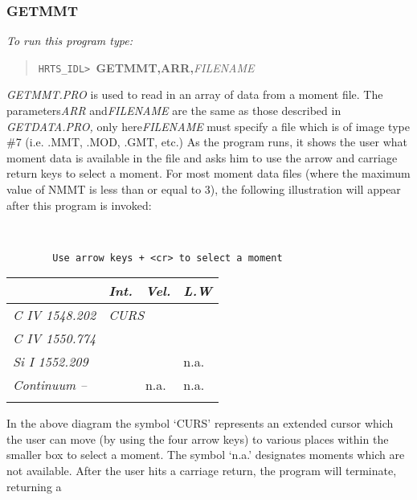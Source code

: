 \subsubsection{GETMMT}               

{\em To run this program type:}
\begin{quote}
{\tt HRTS\_IDL> }{\bf GETMMT,ARR,}{\it FILENAME}          
\end{quote}
{\em GETMMT.PRO} is used to read in an array of data from a moment file.
  The parameters{\em ARR} and{\em FILENAME} are the same as those described in 
 {\em GETDATA.PRO,} only here{\em FILENAME} must specify a file which is of
  image type \#7 (i.e. .MMT, .MOD, .GMT, etc.)  As the program runs, it
  shows the user what moment data is available in the file and asks him
  to use the arrow and carriage return keys to select a moment.
  For most moment data files (where the maximum value of NMMT is less
  than or equal to 3), the following illustration will appear after this
  program is invoked:
\begin{verbatim}

                
        Use arrow keys + <cr> to select a moment 
\end{verbatim}
\begin{center}
\begin{tabular}{|l l l l l|}
\hline
                &        & {\em Int.} & {\em Vel.} & {\em L.W} \\    
\hline
\multicolumn{2}{|l|}{\em C IV  1548.202} & \multicolumn{3}{l|}{\em CURS} \\
\cline{3-5}   
\multicolumn{2}{|l|}{\em C IV  1550.774} & \multicolumn{3}{l|}{} \\                       
\multicolumn{2}{|l|}{\em Si I  1552.209} & \multicolumn{2}{l}{} &
\multicolumn{1}{l|}{n.a.} \\
\multicolumn{2}{|l|}{\em Continuum --} & \multicolumn{1}{l}{} &
\multicolumn{1}{l}{n.a.} & \multicolumn{1}{l|}{n.a.} \\ \cline{3-5}
     &  &  &  &  \\ \hline    
\end{tabular}           
\end{center}    
  In the above diagram the symbol `CURS' represents an extended cursor
  which the user can move (by using the four arrow keys) to various
  places within the smaller box to select a moment.  The symbol `n.a.'
  designates moments which are not available.  After the user hits a
  carriage return, the program will terminate, returning a 
